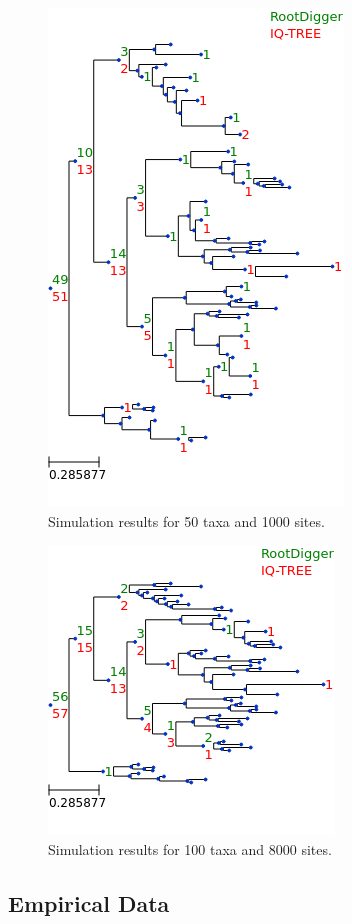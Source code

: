 \documentclass{article}
\begin{document}
\begin{figure}
  \includegraphics{figs/sim_results/50_1000.png}
  \caption{Simulation results for 50 taxa and 1000
  sites. \label{fig:sim-results-50t-1000s}}
\end{figure}

\begin{figure}
  \includegraphics{figs/sim_results/50_8000.png}
  \caption{Simulation results for 100 taxa and 8000
  sites. \label{fig:sim-results-50t-8000s}}
\end{figure}

\subsection{Empirical Data}
\end{document}
